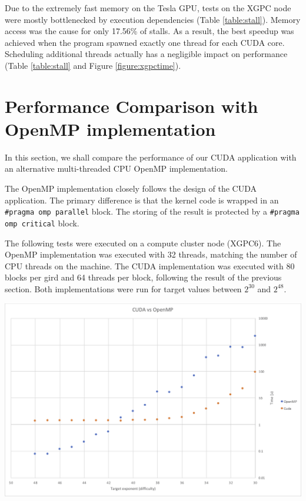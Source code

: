 \documentclass[a4paper,12pt]{article}
\begin{document}
Due to the extremely fast memory on the Tesla GPU, tests on the XGPC node were mostly bottlenecked by execution dependencies (Table \ref{table:stall}). Memory access was the cause for only 17.56\% of stalls. As a result, the best speedup was achieved when the program spawned exactly one thread for each CUDA core. Scheduling additional threads actually has a negligible impact on performance (Table \ref{table:stall} and Figure \ref{figure:xgpctime}).

\section{Performance Comparison with OpenMP implementation}

In this section, we shall compare the performance of our CUDA application with an alternative multi-threaded CPU OpenMP implementation.

The OpenMP implementation closely follows the design of the CUDA application. The primary difference is that the kernel code is wrapped in an \texttt{#pragma omp parallel} block. The storing of the result is protected by a \texttt{#pragma omp critical} block.

The following tests were executed on a compute cluster node (XGPC6). The OpenMP implementation was executed with 32 threads, matching the number of CPU threads on the machine. The CUDA implementation was executed with 80 blocks per gird and 64 threads per block, following the result of the previous section. Both implementations were run for target values between $2^{30}$ and $2^{48}$.

\begin{center}
  \includegraphics[width=\linewidth]{cuda-vs-openmp}
  \label{figure:cudavsopenmp}
\end{center}
\end{document}
